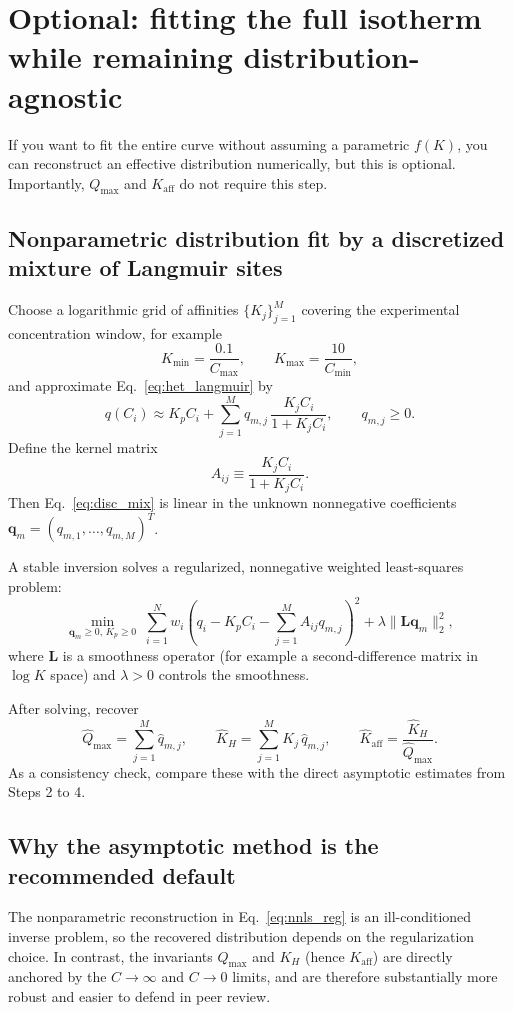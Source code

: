 \documentclass[12pt]{article}
\begin{document}
	\section{Optional: fitting the full isotherm while remaining distribution-agnostic}
	
	If you want to fit the entire curve without assuming a parametric $f(K)$, you can reconstruct an effective distribution numerically, but this is optional. Importantly, $Q_{\max}$ and $K_{\mathrm{aff}}$ do not require this step.
	
	\subsection{Nonparametric distribution fit by a discretized mixture of Langmuir sites}
	
	Choose a logarithmic grid of affinities $\{K_j\}_{j=1}^M$ covering the experimental concentration window, for example
	\[
	K_{\min} = \frac{0.1}{C_{\max}},\qquad
	K_{\max} = \frac{10}{C_{\min}},
	\]
	and approximate Eq.~\eqref{eq:het_langmuir} by
	\begin{equation}
		q(C_i) \approx K_p C_i + \sum_{j=1}^{M} q_{m,j}\,\frac{K_j C_i}{1+K_j C_i},
		\qquad q_{m,j}\ge 0.
		\label{eq:disc_mix}
	\end{equation}
	Define the kernel matrix
	\begin{equation}
		A_{ij} \equiv \frac{K_j C_i}{1+K_j C_i}.
	\end{equation}
	Then Eq.~\eqref{eq:disc_mix} is linear in the unknown nonnegative coefficients $\bm{q}_m=(q_{m,1},\dots,q_{m,M})^T$.
	
	A stable inversion solves a regularized, nonnegative weighted least-squares problem:
	\begin{equation}
		\min_{\bm{q}_m\ge 0,\,K_p\ge 0}\;
		\sum_{i=1}^{N} w_i\left(q_i - K_p C_i - \sum_{j=1}^{M} A_{ij} q_{m,j}\right)^2
		+ \lambda \|\bm{L}\bm{q}_m\|_2^2,
		\label{eq:nnls_reg}
	\end{equation}
	where $\bm{L}$ is a smoothness operator (for example a second-difference matrix in $\log K$ space) and $\lambda>0$ controls the smoothness.
	
	After solving, recover
	\begin{equation}
		\widehat{Q}_{\max} = \sum_{j=1}^{M} \widehat{q}_{m,j},
		\qquad
		\widehat{K}_H = \sum_{j=1}^{M} K_j\,\widehat{q}_{m,j},
		\qquad
		\widehat{K}_{\mathrm{aff}} = \frac{\widehat{K}_H}{\widehat{Q}_{\max}}.
	\end{equation}
	As a consistency check, compare these with the direct asymptotic estimates from Steps 2 to 4.
	
	\subsection{Why the asymptotic method is the recommended default}
	
	The nonparametric reconstruction in Eq.~\eqref{eq:nnls_reg} is an ill-conditioned inverse problem, so the recovered distribution depends on the regularization choice. In contrast, the invariants $Q_{\max}$ and $K_H$ (hence $K_{\mathrm{aff}}$) are directly anchored by the $C\to\infty$ and $C\to 0$ limits, and are therefore substantially more robust and easier to defend in peer review.
	
\end{document}
